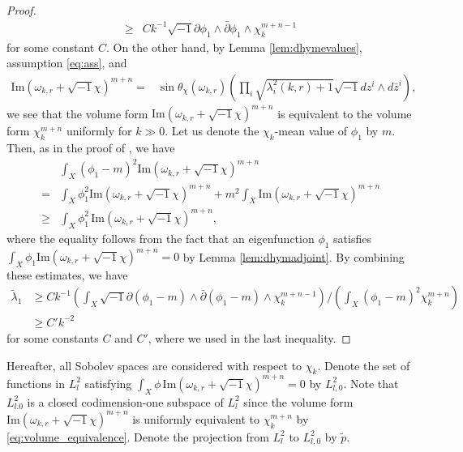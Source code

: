 \documentclass{amsart}
\numberwithin{equation}{section}
\theoremstyle{plain}
\theoremstyle{definition}
\theoremstyle{remark}
\begin{document}
\begin{proof}
\begin{align*}
        \ge&Ck^{-1}\sqrt{-1}\partial\phi_1\wedge\bar{\partial}\phi_1\wedge\chi_k^{m+n-1}
    \end{align*}
    for some constant $C$. On the other hand, by Lemma \ref{lem:dhymevalues}, assumption \eqref{eq:ass}, and
    \begin{align}\label{eq:volume_equivalence}
        \mathrm{Im}(\omega_{k,r}+\sqrt{-1}\chi)^{m+n}=& \sin\theta_\chi(\omega_{k,r}) \left(\prod_i \sqrt{\lambda_i^2(k,r)+1}\sqrt{-1}dz^i\wedge d\bar{z}^i\right),
    \end{align}
    we see that the volume form $\mathrm{Im}(\omega_{k,r}+\sqrt{-1}\chi)^{m+n}$ is equivalent to the volume form $\chi_k^{m+n}$ uniformly for $k\gg0$.
    Let us denote the $\chi_k$-mean value of $\phi_1$ by $m$. Then, as in the proof of \cite[Lemma 6.5]{Fine}, we have
    \begin{align*}
        &\int_X(\phi_1-m)^2\mathrm{Im}(\omega_{k,r}+\sqrt{-1}\chi)^{m+n}\\
        =&\int_X\phi_1^2\mathrm{Im}(\omega_{k,r}+\sqrt{-1}\chi)^{m+n}+m^2\int_X\mathrm{Im}(\omega_{k,r}+\sqrt{-1}\chi)^{m+n}\\
        \ge&\int_X\phi_1^2\, \mathrm{Im}(\omega_{k,r}+\sqrt{-1}\chi)^{m+n},
    \end{align*}
    where the equality follows from the fact that an eigenfunction $\phi_1$ satisfies $\int_X\phi_1\mathrm{Im}(\omega_{k,r}+\sqrt{-1}\chi)^{m+n}=0$ by Lemma \ref{lem:dhymadjoint}. By combining these estimates, we have
    \begin{align*}
        \tilde{\lambda}_1
        &\ge Ck^{-1}\left(\int_X\sqrt{-1}\partial(\phi_1-m)\wedge\bar{\partial}(\phi_1-m)\wedge\chi_k^{m+n-1}\right)\Big/\left(\int_X(\phi_1-m)^2\chi_k^{m+n}\right)\\
        &\ge C'k^{-2}
    \end{align*}
    for some constants $C$ and $C'$, where we used \cite[Lemma 6.5]{Fine} in the last inequality.
\end{proof}

Hereafter, all Sobolev spaces are considered with respect to $\chi_k$. Denote the set of functions in $L^2_l$ satisfying $\int_X\phi\, \mathrm{Im}(\omega_{k,r}+\sqrt{-1}\chi)^{m+n}=0$ by $L^2_{l,0}$. Note that $L^2_{l.0}$ is a closed codimension-one subspace of $L^2_l$ since the volume form $\mathrm{Im}(\omega_{k,r}+\sqrt{-1}\chi)^{m+n}$ is uniformly equivalent to $\chi_k^{m+n}$ by \eqref{eq:volume_equivalence}. Denote the projection from  $L^2_l$ to $L^2_{l,0}$ by $\tilde{p}$.
\end{document}
